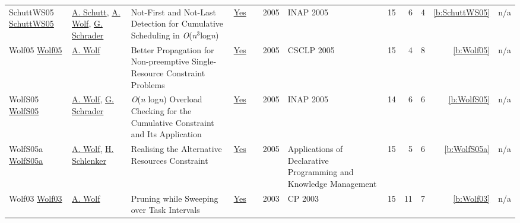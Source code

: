 {\begin{longtable}{>{\raggedright\arraybackslash}p{3cm}>{\raggedright\arraybackslash}p{6cm}>{\raggedright\arraybackslash}p{6.5cm}rrrp{2.5cm}rrrrr}
SchuttWS05 \href{https://doi.org/10.1007/11963578_6}{SchuttWS05} & \hyperref[auth:a125]{A. Schutt}, \hyperref[auth:a51]{A. Wolf}, \hyperref[auth:a716]{G. Schrader} & Not-First and Not-Last Detection for Cumulative Scheduling in \emph{O}(\emph{n}\({}^{\mbox{3}}\)log\emph{n}) & \href{../works/SchuttWS05.pdf}{Yes} & \cite{SchuttWS05} & 2005 & INAP 2005 & 15 & 6 & 4 & \ref{b:SchuttWS05} & n/a\\
Wolf05 \href{http://dx.doi.org/10.1007/11402763_15}{Wolf05} & \hyperref[auth:a51]{A. Wolf} & Better Propagation for Non-preemptive Single-Resource Constraint Problems & \href{../works/Wolf05.pdf}{Yes} & \cite{Wolf05} & 2005 & CSCLP 2005 & 15 & 4 & 8 & \ref{b:Wolf05} & n/a\\
WolfS05 \href{https://doi.org/10.1007/11963578_8}{WolfS05} & \hyperref[auth:a51]{A. Wolf}, \hyperref[auth:a716]{G. Schrader} & \emph{O}(\emph{n} log\emph{n}) Overload Checking for the Cumulative Constraint and Its Application & \href{../works/WolfS05.pdf}{Yes} & \cite{WolfS05} & 2005 & INAP 2005 & 14 & 6 & 6 & \ref{b:WolfS05} & n/a\\
WolfS05a \href{http://dx.doi.org/10.1007/11415763_12}{WolfS05a} & \hyperref[auth:a51]{A. Wolf}, \hyperref[auth:a717]{H. Schlenker} & Realising the Alternative Resources Constraint & \href{../works/WolfS05a.pdf}{Yes} & \cite{WolfS05a} & 2005 & Applications of Declarative Programming and Knowledge Management & 15 & 5 & 6 & \ref{b:WolfS05a} & n/a\\
Wolf03 \href{https://doi.org/10.1007/978-3-540-45193-8_50}{Wolf03} & \hyperref[auth:a51]{A. Wolf} & Pruning while Sweeping over Task Intervals & \href{../works/Wolf03.pdf}{Yes} & \cite{Wolf03} & 2003 & CP 2003 & 15 & 11 & 7 & \ref{b:Wolf03} & n/a\\
\end{longtable}
}

\clearpage
